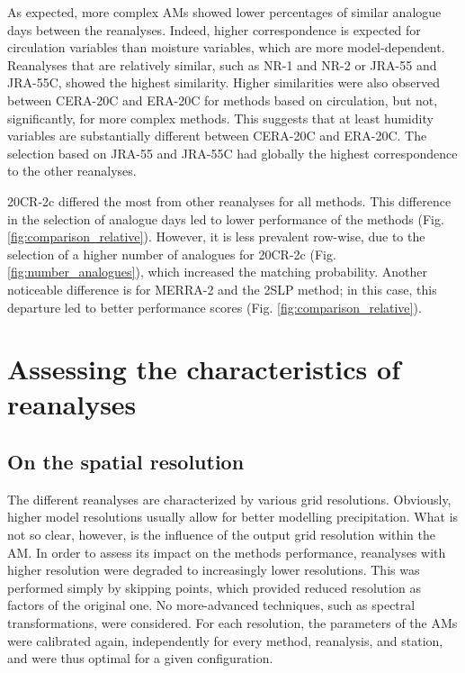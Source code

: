 \documentclass{ametsoc}
\begin{document}
	As expected, more complex AMs showed lower percentages of similar analogue days between the reanalyses. Indeed, higher correspondence is expected for circulation variables than moisture variables, which are more model-dependent. Reanalyses that are relatively similar, such as NR-1 and NR-2 or JRA-55 and JRA-55C, showed the highest similarity. Higher similarities were also observed between CERA-20C and ERA-20C for methods based on circulation, but not, significantly, for more complex methods. This suggests that at least humidity variables are substantially different between CERA-20C and ERA-20C. The selection based on JRA-55 and JRA-55C had globally the highest correspondence to the other reanalyses.
	
	20CR-2c differed the most from other reanalyses for all methods. This difference in the selection of analogue days led to lower performance of the methods (Fig. \ref{fig:comparison_relative}). However, it is less prevalent row-wise, due to the selection of a higher number of analogues for 20CR-2c (Fig. \ref{fig:number_analogues}), which increased the matching probability. Another noticeable difference is for MERRA-2 and the 2SLP method; in this case, this departure led to better performance scores (Fig. \ref{fig:comparison_relative}).
	
	
	\section{Assessing the characteristics of reanalyses}
	\label{sec:analyzes}
	
	\subsection{On the spatial resolution}
	\label{sec:resolution}
	
	The different reanalyses are characterized by various grid resolutions. Obviously, higher model resolutions usually allow for better modelling precipitation. What is not so clear, however, is the influence of the output grid resolution within the AM. In order to assess its impact on the methods performance, reanalyses with higher resolution were degraded to increasingly lower resolutions. This was performed simply by skipping points, which provided reduced resolution as factors of the original one. No more-advanced techniques, such as spectral transformations, were considered. For each resolution, the parameters of the AMs were calibrated again, independently for every method, reanalysis, and station, and were thus optimal for a given configuration. 
	
\end{document}
